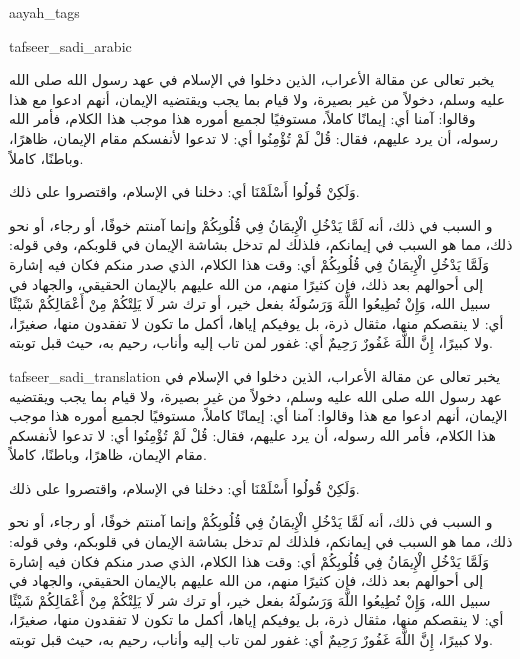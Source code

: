 \begin{taggedblock}{aayah_tags}
\end{taggedblock}
\begin{taggedblock}{tafseer_sadi_arabic}
\begin{Arabic}
يخبر تعالى عن مقالة الأعراب، الذين دخلوا في الإسلام في عهد رسول الله صلى الله عليه وسلم، دخولاً من غير بصيرة، ولا قيام بما يجب ويقتضيه الإيمان، أنهم ادعوا مع هذا وقالوا: آمنا أي: إيمانًا كاملاً، مستوفيًا لجميع أموره هذا موجب هذا الكلام، فأمر الله رسوله، أن يرد عليهم، فقال:
{ قُلْ لَمْ تُؤْمِنُوا }
أي: لا تدعوا لأنفسكم مقام الإيمان، ظاهرًا، وباطنًا، كاملاً.

{ وَلَكِنْ قُولُوا أَسْلَمْنَا }
أي: دخلنا في الإسلام، واقتصروا على ذلك.

{ و }
السبب في ذلك، أنه
{ لَمَّا يَدْخُلِ الْإِيمَانُ فِي قُلُوبِكُمْ }
وإنما آمنتم خوفًا، أو رجاء، أو نحو ذلك، مما هو السبب في إيمانكم، فلذلك لم تدخل بشاشة الإيمان في قلوبكم، وفي قوله:
{ وَلَمَّا يَدْخُلِ الْإِيمَانُ فِي قُلُوبِكُمْ }
أي: وقت هذا الكلام، الذي صدر منكم فكان فيه إشارة إلى أحوالهم بعد ذلك، فإن كثيرًا منهم، من الله عليهم بالإيمان الحقيقي، والجهاد في سبيل الله،
{ وَإِنْ تُطِيعُوا اللَّهَ وَرَسُولَهُ }
بفعل خير، أو ترك شر
{ لَا يَلِتْكُمْ مِنْ أَعْمَالِكُمْ شَيْئًا }
أي: لا ينقصكم منها، مثقال ذرة، بل يوفيكم إياها، أكمل ما تكون لا تفقدون منها، صغيرًا، ولا كبيرًا،
{ إِنَّ اللَّهَ غَفُورٌ رَحِيمٌ }
أي: غفور لمن تاب إليه وأناب، رحيم به، حيث قبل توبته.
\end{Arabic}
\end{taggedblock}
\begin{taggedblock}{tafseer_sadi_translation}
يخبر تعالى عن مقالة الأعراب، الذين دخلوا في الإسلام في عهد رسول الله صلى الله عليه وسلم، دخولاً من غير بصيرة، ولا قيام بما يجب ويقتضيه الإيمان، أنهم ادعوا مع هذا وقالوا: آمنا أي: إيمانًا كاملاً، مستوفيًا لجميع أموره هذا موجب هذا الكلام، فأمر الله رسوله، أن يرد عليهم، فقال:
{ قُلْ لَمْ تُؤْمِنُوا }
أي: لا تدعوا لأنفسكم مقام الإيمان، ظاهرًا، وباطنًا، كاملاً.

{ وَلَكِنْ قُولُوا أَسْلَمْنَا }
أي: دخلنا في الإسلام، واقتصروا على ذلك.

{ و }
السبب في ذلك، أنه
{ لَمَّا يَدْخُلِ الْإِيمَانُ فِي قُلُوبِكُمْ }
وإنما آمنتم خوفًا، أو رجاء، أو نحو ذلك، مما هو السبب في إيمانكم، فلذلك لم تدخل بشاشة الإيمان في قلوبكم، وفي قوله:
{ وَلَمَّا يَدْخُلِ الْإِيمَانُ فِي قُلُوبِكُمْ }
أي: وقت هذا الكلام، الذي صدر منكم فكان فيه إشارة إلى أحوالهم بعد ذلك، فإن كثيرًا منهم، من الله عليهم بالإيمان الحقيقي، والجهاد في سبيل الله،
{ وَإِنْ تُطِيعُوا اللَّهَ وَرَسُولَهُ }
بفعل خير، أو ترك شر
{ لَا يَلِتْكُمْ مِنْ أَعْمَالِكُمْ شَيْئًا }
أي: لا ينقصكم منها، مثقال ذرة، بل يوفيكم إياها، أكمل ما تكون لا تفقدون منها، صغيرًا، ولا كبيرًا،
{ إِنَّ اللَّهَ غَفُورٌ رَحِيمٌ }
أي: غفور لمن تاب إليه وأناب، رحيم به، حيث قبل توبته.
\end{taggedblock}
